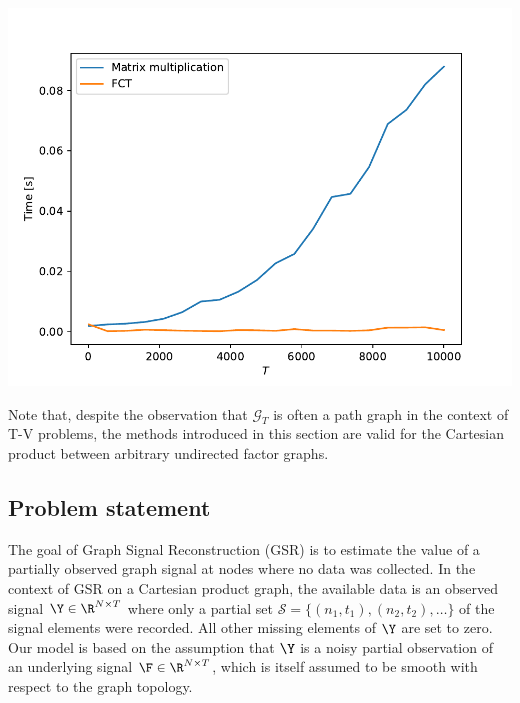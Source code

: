 {    %
        \begin{center}
        \includegraphics[width=\linewidth]{Figures/DCT.pdf}
        \end{center}
    
 
} 



Note that, despite the observation that $\mathcal{G}_T$ is often a path graph in the context of T-V problems, the methods introduced in this section are valid for the Cartesian product between arbitrary undirected factor graphs. 

\subsection{Problem statement}


The goal of Graph Signal Reconstruction (GSR) is to estimate the value of a partially observed graph signal at nodes where no data was collected. In the context of GSR on a Cartesian product graph, the available data is an observed signal $\Y \in \R^{N \times T}$ where only a partial set $\mathcal{S} = \{(n_1, t_1), (n_2, t_2), \dots \}$ of the signal elements were recorded. All other missing elements of $\Y$ are set to zero. Our model is based on the assumption that $\Y$ is a noisy partial observation of an underlying signal $\F \in \R^{N \times T}$, which is itself assumed to be smooth with respect to the graph topology. 

